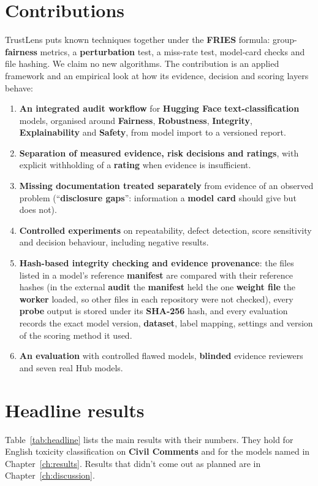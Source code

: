 \section{Contributions}
TrustLens puts known techniques together under the \textbf{FRIES} formula: group-\textbf{fairness} metrics, a \textbf{perturbation} test, a miss-rate test, model-card checks and file hashing. We claim no new algorithms. The contribution is an applied framework and an empirical look at how its evidence, decision and scoring layers behave:
\begin{enumerate}[nosep]
\item \textbf{An integrated audit workflow} for \textbf{Hugging Face} \textbf{text-classification} models, organised around \textbf{Fairness}, \textbf{Robustness}, \textbf{Integrity}, \textbf{Explainability} and \textbf{Safety}, from model import to a versioned report.
\item \textbf{Separation of measured evidence, risk decisions and ratings}, with explicit withholding of a \textbf{rating} when evidence is insufficient.
\item \textbf{Missing documentation treated separately} from evidence of an observed problem (``\textbf{disclosure gaps}'': information a \textbf{model card} should give but does not).
\item \textbf{Controlled experiments} on repeatability, defect detection, score sensitivity and decision behaviour, including negative results.
\item \textbf{Hash-based integrity checking and evidence provenance}: the files listed in a model's reference \textbf{manifest} are compared with their reference hashes (in the external \textbf{audit} the \textbf{manifest} held the one \textbf{weight file} the \textbf{worker} loaded, so other files in each repository were not checked), every \textbf{probe} output is stored under its \textbf{SHA-256} hash, and every evaluation records the exact model version, \textbf{dataset}, label mapping, settings and version of the scoring method it used.
\item \textbf{An evaluation} with controlled flawed models, \textbf{blinded} evidence reviewers and seven real Hub models.
\end{enumerate}

\section{Headline results}\label{sec:headline}
Table~\ref{tab:headline} lists the main results with their numbers. They hold for English toxicity classification on \textbf{Civil Comments} and for the models named in Chapter~\ref{ch:results}. Results that didn't come out as planned are in Chapter~\ref{ch:discussion}.

